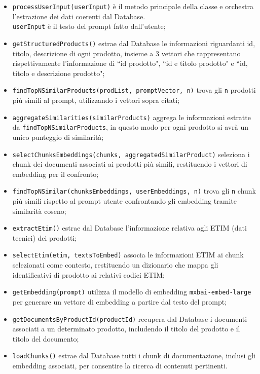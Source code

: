 \begin{itemize}
    \item \texttt{processUserInput(userInput)} \`e il metodo principale della classe e orchestra l'estrazione dei dati coerenti dal Database.\\ \texttt{userInput} \`e il testo del prompt fatto dall'utente;
    \item \texttt{getStructuredProducts()} estrae dal Database le informazioni riguardanti id, titolo, descrizione di ogni prodotto, insieme a 3 vettori che rappresentano rispettivamente l'informazione di ``id prodotto", ``id e titolo prodotto" e ``id, titolo e descrizione prodotto";
    \item \texttt{findTopNSimilarProducts(prodList, promptVector, n)} trova gli \texttt{n} prodotti pi\`u simili al prompt, utilizzando i vettori sopra citati;
    \item \texttt{aggregateSimilarities(similarProducts)} aggrega le informazioni estratte da \texttt{findTopNSimilarProducts}, in questo modo per ogni prodotto si avr\`a un unico punteggio di similarit\`a;
    \item \texttt{selectChunksEmbeddings(chunks, aggregatedSimilarProduct)} seleziona i chunk dei documenti associati ai prodotti pi\`u simili, restituendo i vettori di embedding per il confronto;
    \item \texttt{findTopNSimilar(chunksEmbeddings, userEmbeddings, n)} trova gli \texttt{n} chunk pi\`u simili rispetto al prompt utente confrontando gli embedding tramite similarit\`a coseno;
    \item \texttt{extractEtim()} estrae dal Database l'informazione relativa agli ETIM (dati tecnici) dei prodotti;
    \item \texttt{selectEtim(etim, textsToEmbed)} associa le informazioni ETIM ai chunk selezionati come contesto, restituendo un dizionario che mappa gli identificativi di prodotto ai relativi codici ETIM;
    \item \texttt{getEmbedding(prompt)} utilizza il modello di embedding \texttt{mxbai-embed-large} per generare un vettore di embedding a partire dal testo del prompt;
    \item \texttt{getDocumentsByProductId(productId)} recupera dal Database i documenti associati a un determinato prodotto, includendo il titolo del prodotto e il titolo del documento;
    \item \texttt{loadChunks()} estrae dal Database tutti i chunk di documentazione, inclusi gli embedding associati, per consentire la ricerca di contenuti pertinenti.
\end{itemize}

